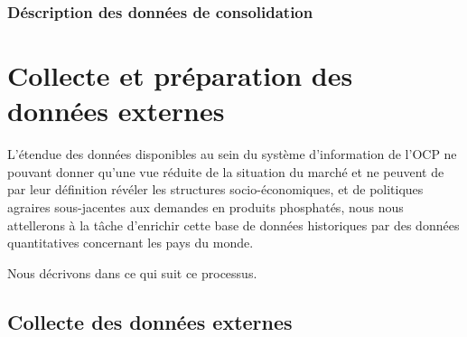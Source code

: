 	\subsubsection{Déscription des données de consolidation}
	\section{Collecte et préparation des données externes}
	L'étendue des données disponibles au sein du système d'information de l'OCP ne pouvant donner qu'une vue réduite de la situation du marché et ne peuvent de par leur définition révéler les structures socio-économiques,  et de politiques agraires sous-jacentes aux demandes en produits phosphatés, nous nous attellerons à la tâche d'enrichir cette base de données historiques par des données quantitatives concernant les pays du monde.
	\par
	Nous décrivons dans ce qui suit ce processus. 
	\subsection{Collecte des données externes}
